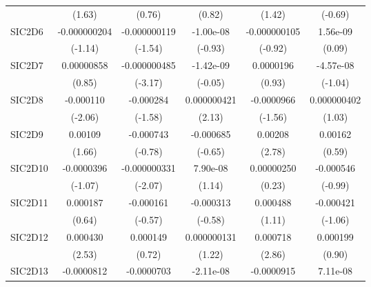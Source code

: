 \begin{table}[htbp]
\begin{tabular}{l*{5}{c}}
            &      (1.63)         &      (0.76)         &      (0.82)         &      (1.42)         &     (-0.69)         \\
SIC2D6      &-0.000000204         &-0.000000119         &   -1.00e-08         &-0.000000105         &    1.56e-09         \\
            &     (-1.14)         &     (-1.54)         &     (-0.93)         &     (-0.92)         &      (0.09)         \\
SIC2D7      &  0.00000858         &-0.000000485\sym{**} &   -1.42e-09         &   0.0000196         &   -4.57e-08         \\
            &      (0.85)         &     (-3.17)         &     (-0.05)         &      (0.93)         &     (-1.04)         \\
SIC2D8      &   -0.000110\sym{*}  &   -0.000284         & 0.000000421\sym{*}  &  -0.0000966         & 0.000000402         \\
            &     (-2.06)         &     (-1.58)         &      (2.13)         &     (-1.56)         &      (1.03)         \\
SIC2D9      &     0.00109         &   -0.000743         &   -0.000685         &     0.00208\sym{**} &     0.00162         \\
            &      (1.66)         &     (-0.78)         &     (-0.65)         &      (2.78)         &      (0.59)         \\
SIC2D10     &  -0.0000396         &-0.000000331\sym{*}  &    7.90e-08         &  0.00000250         &   -0.000546         \\
            &     (-1.07)         &     (-2.07)         &      (1.14)         &      (0.23)         &     (-0.99)         \\
SIC2D11     &    0.000187         &   -0.000161         &   -0.000313         &    0.000488         &   -0.000421         \\
            &      (0.64)         &     (-0.57)         &     (-0.58)         &      (1.11)         &     (-1.06)         \\
SIC2D12     &    0.000430\sym{*}  &    0.000149         & 0.000000131         &    0.000718\sym{**} &    0.000199         \\
            &      (2.53)         &      (0.72)         &      (1.22)         &      (2.86)         &      (0.90)         \\
SIC2D13     &  -0.0000812         &  -0.0000703         &   -2.11e-08         &  -0.0000915         &    7.11e-08         \\

\end{tabular}
\end{table}
